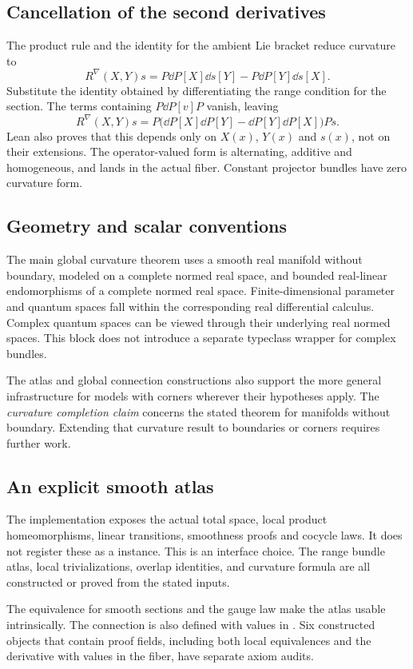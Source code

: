 \subsection{Cancellation of the second derivatives}
The product rule and the identity for the ambient Lie bracket reduce curvature to
\[
R^\nabla(X,Y)s=P\dd P[X]\dd s[Y]-P\dd P[Y]\dd s[X].
\]
Substitute the identity obtained by differentiating the range condition for the section. The terms containing $P\dd P[v]P$ vanish, leaving
\[
R^\nabla(X,Y)s=
P\bigl(\dd P[X]\dd P[Y]-\dd P[Y]\dd P[X]\bigr)P s.
\]
Lean also proves that this depends only on $X(x)$, $Y(x)$ and $s(x)$, not on their extensions. The operator-valued form is alternating, additive and homogeneous, and lands in the actual fiber. Constant projector bundles have zero curvature form.





\subsection{Geometry and scalar conventions}
The main global curvature theorem uses a smooth real manifold without boundary, modeled on a complete normed real space, and bounded real-linear endomorphisms of a complete normed real space. Finite-dimensional parameter and quantum spaces fall within the corresponding real differential calculus. Complex quantum spaces can be viewed through their underlying real normed spaces. This block does not introduce a separate typeclass wrapper for complex bundles.

The atlas and global connection constructions also support the more general infrastructure for models with corners wherever their hypotheses apply. The \emph{curvature completion claim} concerns the stated theorem for manifolds without boundary. Extending that curvature result to boundaries or corners requires further work.

\subsection{An explicit smooth atlas}
The implementation exposes the actual total space, local product homeomorphisms, linear transitions, smoothness proofs and cocycle laws. It does not register these as a  instance. This is an interface choice. The range bundle atlas, local trivializations, overlap identities, and curvature formula are all constructed or proved from the stated inputs.

The equivalence for smooth sections and the gauge law make the atlas usable intrinsically. The connection is also defined with values in . Six constructed objects that contain proof fields, including both local equivalences and the derivative with values in the fiber, have separate axiom audits.

